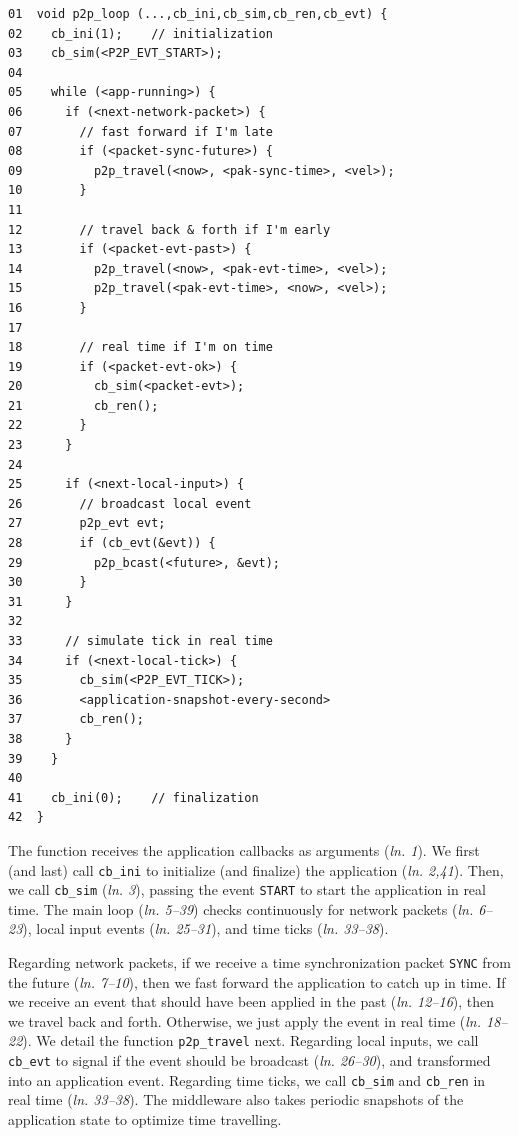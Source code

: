\documentclass[12pt]{article}
\newcommand{\code}[1]  {\texttt{\small{#1}}}
\newcommand{\lin}[1]{(\emph{ln. #1}\xspace)}
\begin{document}
{\footnotesize
\begin{verbatim}
01  void p2p_loop (...,cb_ini,cb_sim,cb_ren,cb_evt) {
02    cb_ini(1);    // initialization
03    cb_sim(<P2P_EVT_START>);
04
05    while (<app-running>) {
06      if (<next-network-packet>) {
07        // fast forward if I'm late
08        if (<packet-sync-future>) {
09          p2p_travel(<now>, <pak-sync-time>, <vel>);
10        }
11
12        // travel back & forth if I'm early
13        if (<packet-evt-past>) {
14          p2p_travel(<now>, <pak-evt-time>, <vel>);
15          p2p_travel(<pak-evt-time>, <now>, <vel>);
16        }
17
18        // real time if I'm on time
19        if (<packet-evt-ok>) {
20          cb_sim(<packet-evt>);
21          cb_ren();
22        }
23      }
24
25      if (<next-local-input>) {
26        // broadcast local event
27        p2p_evt evt;
28        if (cb_evt(&evt)) {
29          p2p_bcast(<future>, &evt);
30        }
31      }
32
33      // simulate tick in real time
34      if (<next-local-tick>) {
35        cb_sim(<P2P_EVT_TICK>);
36        <application-snapshot-every-second>
37        cb_ren();
38      }
39    }
40
41    cb_ini(0);    // finalization
42  }
\end{verbatim}
}

The function receives the application callbacks as arguments \lin{1}.
We first (and last) call \code{cb\_ini} to initialize (and finalize) the
application \lin{2,41}.
Then, we call \code{cb\_sim} \lin{3}, passing the event \code{START} to start
the application in real time.
The main loop \lin{5--39} checks continuously for network packets \lin{6--23},
local input events \lin{25--31}, and time ticks \lin{33--38}.

Regarding network packets, if we receive a time synchronization packet
\code{SYNC} from the future \lin{7--10}, then we fast forward the application
to catch up in time. %
If we receive an event that should have been applied in the past \lin{12--16},
then we travel back and forth. %
Otherwise, we just apply the event in real time \lin{18--22}.
We detail the function \code{p2p\_travel} next.
%
Regarding local inputs, we call \code{cb\_evt} to signal if the event should be
broadcast \lin{26--30}, and transformed into an application event.
%
Regarding time ticks, we call \code{cb\_sim} and \code{cb\_ren} in real time
\lin{33--38}.
The middleware also takes periodic snapshots of the application state to
optimize time travelling. %
\end{document}
